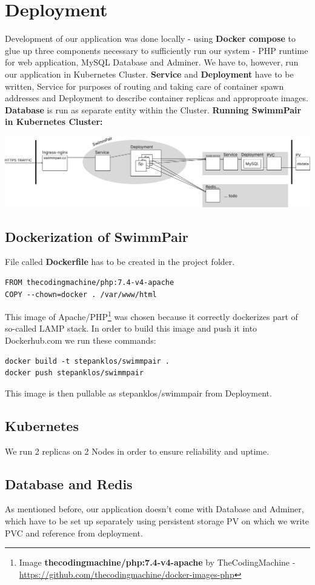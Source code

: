 \chapter{Deployment}
Development of our application was done locally - using \textbf{Docker compose} to glue up three components necessary to sufficiently run our system - PHP runtime for web application, MySQL Database and Adminer. We have to, however, run our application in Kubernetes Cluster. \textbf{Service} and \textbf{Deployment} have to be written, Service for purposes of routing and taking care of container spawn addresses and Deployment to describe container replicas and approproate images. \textbf{Database} is run as separate entity within the Cluster.
\newline
\textbf{Running SwimmPair in Kubernetes Cluster:}
\par
\includegraphics[scale=0.275]{img/swimmpair_deployment_k8s.png}
\section*{Dockerization of SwimmPair}
File called \textbf{Dockerfile} has to be created in the project folder.
\begin{lstlisting}
FROM thecodingmachine/php:7.4-v4-apache
COPY --chown=docker . /var/www/html
\end{lstlisting}
This image of Apache/PHP\footnote{Image \textbf{thecodingmachine/php:7.4-v4-apache}  by TheCodingMachine - \url{https://github.com/thecodingmachine/docker-images-php}} was chosen because it correctly dockerizes part of so-called LAMP stack. In order to build this image and push it into Dockerhub.com we run these commands:
\begin{lstlisting}
docker build -t stepanklos/swimmpair .
docker push stepanklos/swimmpair
\end{lstlisting}
This image is then pullable as stepanklos/swimmpair from Deployment.
\section*{Kubernetes}
We run 2 replicas on 2 Nodes in order to ensure reliability and uptime. 
\section*{Database and Redis}
As mentioned before, our application doesn't come with Database and Adminer, which have to be set up separately using persistent storage PV on which we write PVC and reference from deployment. 
